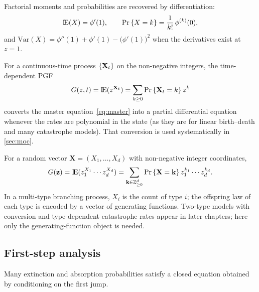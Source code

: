 Factorial moments and probabilities are recovered by differentiation:
\begin{equation}
\label{eq:pgf-recover}
{\rm I}\!{\rm E}(X)=\phi'(1),\qquad
{\text{Pr}\left\{X=k\right\}}=\frac{1}{k!}\,\phi^{(k)}(0),
\end{equation}
and \(\mathrm{Var}(X)=\phi''(1)+\phi'(1)-\bigl(\phi'(1)\bigr)^2\) when the derivatives exist at \(z=1\).

For a continuous-time process \(\{{\bf X}_t\}\) on the non-negative integers, the time-dependent PGF
\begin{equation}
\label{eq:pgf-t}
G(z,t)={\rm I}\!{\rm E}(z^{{{\bf X}_t}})=\sum_{k\ge0}{\text{Pr}\left\{{{\bf X}_t}=k\right\}}\,z^k
\end{equation}
converts the master equation~\eqref{eq:master} into a partial differential equation whenever the rates are polynomial in the state (as they are for linear birth--death and many catastrophe models). That conversion is used systematically in \cref{sec:moc}.

\begin{definition}
\label{def:multi-pgf}
For a random vector \(\mathbf{X}=(X_1,\dots,X_d)\) with non-negative integer coordinates,
\begin{equation}
\label{eq:pgf-multi}
G(\mathbf{z})={\rm I}\!{\rm E}(z_1^{X_1}\cdots z_d^{X_d})=\sum_{\mathbf{k}\in\mathbb{Z}_{\ge0}^d}{\text{Pr}\left\{\mathbf{X}=\mathbf{k}\right\}}\,z_1^{k_1}\cdots z_d^{k_d}.
\end{equation}
In a multi-type branching process, \(X_i\) is the count of type \(i\); the offspring law of each type is encoded by a vector of generating functions. Two-type models with conversion and type-dependent catastrophe rates appear in later chapters; here only the generating-function object is needed.
\end{definition}

\subsection{First-step analysis}
\label{sec:firststep}

Many extinction and absorption probabilities satisfy a closed equation obtained by conditioning on the first jump.


